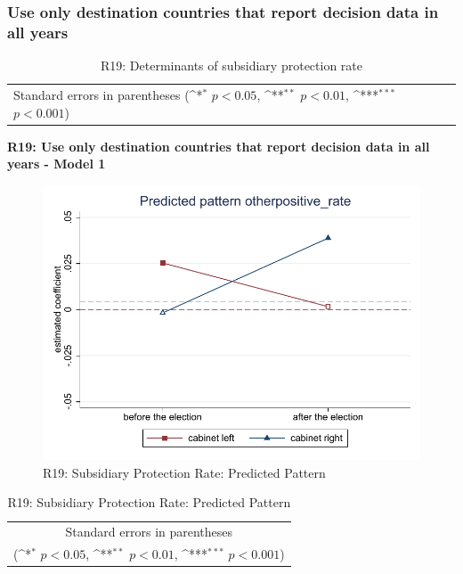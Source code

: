 \documentclass[10pt,a4paper]{scrartcl}
\begin{document}


\clearpage
\FloatBarrier
\subsubsection{Use only destination countries that report decision data in all years}
\begin{table}[!ht]\centering
	\renewcommand{\arraystretch}{1.25}
	\small
	\def\sym#1{\ifmmode^{#1}\else\(^{#1}\)\fi}
	\caption{R19: Determinants of subsidiary protection rate}
	\begin{tabular}{l*{3}{c}}
		\hline\hline
		
		\hline\hline
		\multicolumn{4}{l}{\footnotesize Standard errors in parentheses (\sym{*} \(p<0.05\), \sym{**} \(p<0.01\), \sym{***} \(p<0.001\))}\\
	\end{tabular}
\end{table}

\clearpage
\textbf{R19: Use only destination countries that report decision data in all years - Model 1}
\begin{figure}[!ht]
	\centering
	\includegraphics[width=1\textwidth]{figures_edited/otherpositive_rate_graph1_R19.pdf}
	\caption{R19: Subsidiary Protection Rate: Predicted Pattern}
\end{figure}

\begin{table}[!ht]\centering
	\renewcommand{\arraystretch}{1.25}
	\def\sym#1{\ifmmode^{#1}\else\(^{#1}\)\fi}
	\caption{R19: Subsidiary Protection Rate: Predicted Pattern}
	\begin{tabular}{l*{2}{c}}
		\hline\hline
		
		\hline\hline
		\multicolumn{3}{c}{\footnotesize Standard errors in parentheses} \\
		\multicolumn{3}{c}{\footnotesize (\sym{*} \(p<0.05\), \sym{**} \(p<0.01\), \sym{***} \(p<0.001\))}\\
	\end{tabular}
\end{table}
\end{document}
